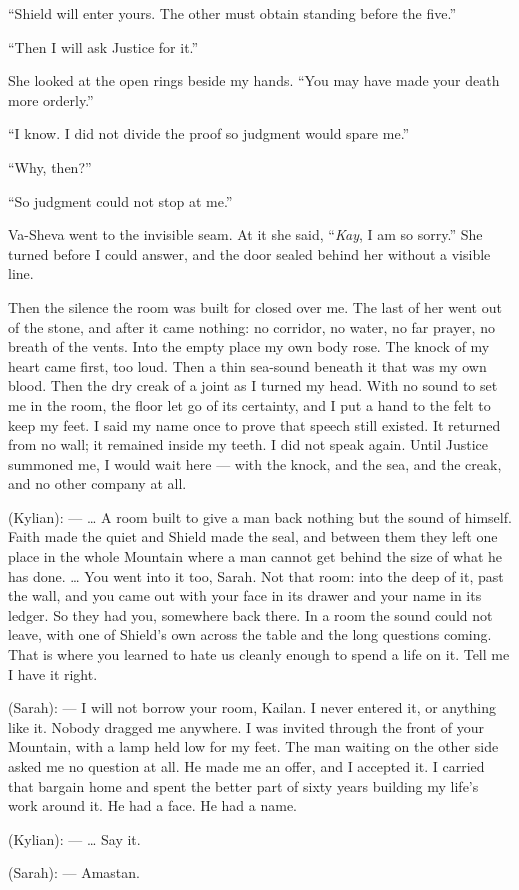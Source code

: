 ``Shield will enter yours. The other must obtain standing before the five.''\par

``Then I will ask Justice for it.''\par

She looked at the open rings beside my hands. ``You may have made your death more orderly.''\par

``I know. I did not divide the proof so judgment would spare me.''\par

``Why, then?''\par

``So judgment could not stop at me.''\par

Va-Sheva went to the invisible seam. At it she said, ``\textit{Kay}, I am so sorry.'' She turned before I could answer, and the door sealed behind her without a visible line.\par

Then the silence the room was built for closed over me. The last of her went out of the stone, and after it came nothing: no corridor, no water, no far prayer, no breath of the vents. Into the empty place my own body rose. The knock of my heart came first, too loud. Then a thin sea-sound beneath it that was my own blood. Then the dry creak of a joint as I turned my head. With no sound to set me in the room, the floor let go of its certainty, and I put a hand to the felt to keep my feet. I said my name once to prove that speech still existed. It returned from no wall; it remained inside my teeth. I did not speak again. Until Justice summoned me, I would wait here --- with the knock, and the sea, and the creak, and no other company at all.\par

\begin{room}

(Kylian): --- \ldots{} A room built to give a man back nothing but the sound of himself. Faith made the quiet and Shield made the seal, and between them they left one place in the whole Mountain where a man cannot get behind the size of what he has done. \ldots{} You went into it too, Sarah. Not that room: into the deep of it, past the wall, and you came out with your face in its drawer and your name in its ledger. So they had you, somewhere back there. In a room the sound could not leave, with one of Shield's own across the table and the long questions coming. That is where you learned to hate us cleanly enough to spend a life on it. Tell me I have it right.

(Sarah): --- I will not borrow your room, Kailan. I never entered it, or anything like it. Nobody dragged me anywhere. I was invited through the front of your Mountain, with a lamp held low for my feet. The man waiting on the other side asked me no question at all. He made me an offer, and I accepted it. I carried that bargain home and spent the better part of sixty years building my life's work around it. He had a face. He had a name.

(Kylian): --- \ldots{} Say it.

(Sarah): --- Amastan.

\end{room}
